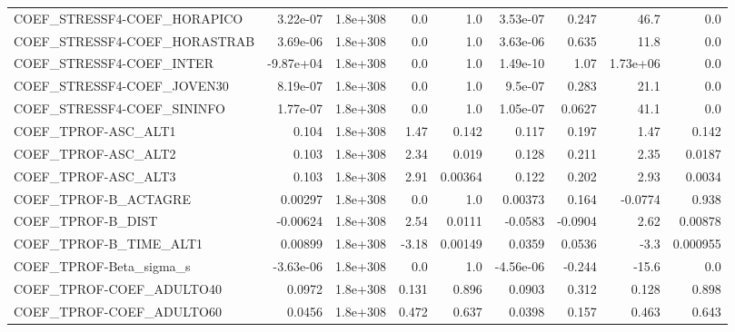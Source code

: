 \begin{tabular}{lrrrrrrrr}
COEF\_STRESSF4-COEF\_HORAPICO       &    3.22e-07 &     1.8e+308 &     0.0 &      1.0 &   3.53e-07 &       0.247 &         46.7 &           0.0 \\
COEF\_STRESSF4-COEF\_HORASTRAB      &    3.69e-06 &     1.8e+308 &     0.0 &      1.0 &   3.63e-06 &       0.635 &         11.8 &           0.0 \\
COEF\_STRESSF4-COEF\_INTER          &   -9.87e+04 &     1.8e+308 &     0.0 &      1.0 &   1.49e-10 &        1.07 &     1.73e+06 &           0.0 \\
COEF\_STRESSF4-COEF\_JOVEN30        &    8.19e-07 &     1.8e+308 &     0.0 &      1.0 &    9.5e-07 &       0.283 &         21.1 &           0.0 \\
COEF\_STRESSF4-COEF\_SININFO        &    1.77e-07 &     1.8e+308 &     0.0 &      1.0 &   1.05e-07 &      0.0627 &         41.1 &           0.0 \\
COEF\_TPROF-ASC\_ALT1               &       0.104 &     1.8e+308 &    1.47 &    0.142 &      0.117 &       0.197 &         1.47 &         0.142 \\
COEF\_TPROF-ASC\_ALT2               &       0.103 &     1.8e+308 &    2.34 &    0.019 &      0.128 &       0.211 &         2.35 &        0.0187 \\
COEF\_TPROF-ASC\_ALT3               &       0.103 &     1.8e+308 &    2.91 &  0.00364 &      0.122 &       0.202 &         2.93 &        0.0034 \\
COEF\_TPROF-B\_ACTAGRE              &     0.00297 &     1.8e+308 &     0.0 &      1.0 &    0.00373 &       0.164 &      -0.0774 &         0.938 \\
COEF\_TPROF-B\_DIST                 &    -0.00624 &     1.8e+308 &    2.54 &   0.0111 &    -0.0583 &     -0.0904 &         2.62 &       0.00878 \\
COEF\_TPROF-B\_TIME\_ALT1            &     0.00899 &     1.8e+308 &   -3.18 &  0.00149 &     0.0359 &      0.0536 &         -3.3 &      0.000955 \\
COEF\_TPROF-Beta\_sigma\_s           &   -3.63e-06 &     1.8e+308 &     0.0 &      1.0 &  -4.56e-06 &      -0.244 &        -15.6 &           0.0 \\
COEF\_TPROF-COEF\_ADULTO40          &      0.0972 &     1.8e+308 &   0.131 &    0.896 &     0.0903 &       0.312 &        0.128 &         0.898 \\
COEF\_TPROF-COEF\_ADULTO60          &      0.0456 &     1.8e+308 &   0.472 &    0.637 &     0.0398 &       0.157 &        0.463 &         0.643 \\

\end{tabular}
